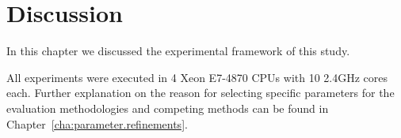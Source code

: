 

\section{Discussion}
\label{sec:discussion.4}

In this chapter we discussed the experimental framework of this study.

All experiments were executed in 4 Xeon E7-4870 CPUs with 10 2.4GHz cores each. Further explanation on the reason for selecting specific parameters for the evaluation methodologies and competing methods can be found in Chapter~\ref{cha:parameter.refinements}.


















